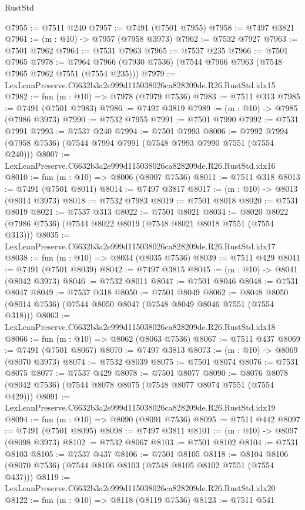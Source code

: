 \begin{lexlean}{RustStd}
\begin{coremodule}
@7955 := @7511 @240
@7957 := @7491 (@7501 @7955)
@7958 := @7497 @3821
@7961 := (m : @10) -> @7957 (@7958 @3973)
@7962 := @7532 @7927
@7963 := @7501 @7962
@7964 := @7531 @7963
@7965 := @7537 @235
@7966 := @7501 @7965
@7978 := @7964 @7966 (@7930 @7536) (@7544 @7966 @7963 (@7548 @7965 @7962 @7551 (@7554 @235)))
@7979 := LexLeanPreserve.C6632b3a2e999d115038026ca828209de.R26.RustStd.idx15
@7982 := fun (m : @10) => @7978 (@7979 @7536)
@7983 := @7511 @313
@7985 := @7491 (@7501 @7983)
@7986 := @7497 @3819
@7989 := (m : @10) -> @7985 (@7986 @3973)
@7990 := @7532 @7955
@7991 := @7501 @7990
@7992 := @7531 @7991
@7993 := @7537 @240
@7994 := @7501 @7993
@8006 := @7992 @7994 (@7958 @7536) (@7544 @7994 @7991 (@7548 @7993 @7990 @7551 (@7554 @240)))
@8007 := LexLeanPreserve.C6632b3a2e999d115038026ca828209de.R26.RustStd.idx16
@8010 := fun (m : @10) => @8006 (@8007 @7536)
@8011 := @7511 @318
@8013 := @7491 (@7501 @8011)
@8014 := @7497 @3817
@8017 := (m : @10) -> @8013 (@8014 @3973)
@8018 := @7532 @7983
@8019 := @7501 @8018
@8020 := @7531 @8019
@8021 := @7537 @313
@8022 := @7501 @8021
@8034 := @8020 @8022 (@7986 @7536) (@7544 @8022 @8019 (@7548 @8021 @8018 @7551 (@7554 @313)))
@8035 := LexLeanPreserve.C6632b3a2e999d115038026ca828209de.R26.RustStd.idx17
@8038 := fun (m : @10) => @8034 (@8035 @7536)
@8039 := @7511 @429
@8041 := @7491 (@7501 @8039)
@8042 := @7497 @3815
@8045 := (m : @10) -> @8041 (@8042 @3973)
@8046 := @7532 @8011
@8047 := @7501 @8046
@8048 := @7531 @8047
@8049 := @7537 @318
@8050 := @7501 @8049
@8062 := @8048 @8050 (@8014 @7536) (@7544 @8050 @8047 (@7548 @8049 @8046 @7551 (@7554 @318)))
@8063 := LexLeanPreserve.C6632b3a2e999d115038026ca828209de.R26.RustStd.idx18
@8066 := fun (m : @10) => @8062 (@8063 @7536)
@8067 := @7511 @437
@8069 := @7491 (@7501 @8067)
@8070 := @7497 @3813
@8073 := (m : @10) -> @8069 (@8070 @3973)
@8074 := @7532 @8039
@8075 := @7501 @8074
@8076 := @7531 @8075
@8077 := @7537 @429
@8078 := @7501 @8077
@8090 := @8076 @8078 (@8042 @7536) (@7544 @8078 @8075 (@7548 @8077 @8074 @7551 (@7554 @429)))
@8091 := LexLeanPreserve.C6632b3a2e999d115038026ca828209de.R26.RustStd.idx19
@8094 := fun (m : @10) => @8090 (@8091 @7536)
@8095 := @7511 @442
@8097 := @7491 (@7501 @8095)
@8098 := @7497 @3811
@8101 := (m : @10) -> @8097 (@8098 @3973)
@8102 := @7532 @8067
@8103 := @7501 @8102
@8104 := @7531 @8103
@8105 := @7537 @437
@8106 := @7501 @8105
@8118 := @8104 @8106 (@8070 @7536) (@7544 @8106 @8103 (@7548 @8105 @8102 @7551 (@7554 @437)))
@8119 := LexLeanPreserve.C6632b3a2e999d115038026ca828209de.R26.RustStd.idx20
@8122 := fun (m : @10) => @8118 (@8119 @7536)
@8123 := @7511 @541

\end{coremodule}
\end{lexlean}
